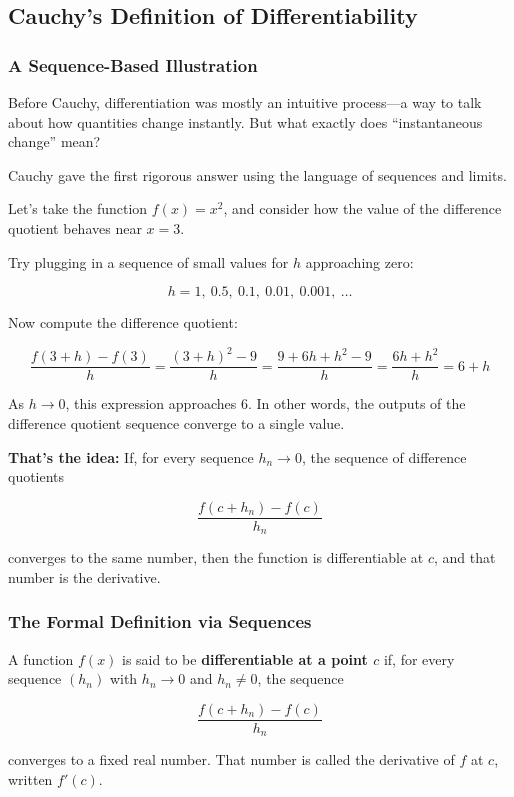 \subsection{Cauchy’s Definition of Differentiability}

\subsubsection{A Sequence-Based Illustration}

Before Cauchy, differentiation was mostly an intuitive process—a way to talk about how quantities change instantly. But what exactly does “instantaneous change” mean?

Cauchy gave the first rigorous answer using the language of sequences and limits.


Let’s take the function \( f(x) = x^2 \), and consider how the value of the difference quotient behaves near \( x = 3 \).

Try plugging in a sequence of small values for \( h \) approaching zero:

\[
h = 1,\ 0.5,\ 0.1,\ 0.01,\ 0.001,\ \dots
\]

Now compute the difference quotient:

\[
\frac{f(3 + h) - f(3)}{h} = \frac{(3 + h)^2 - 9}{h}
= \frac{9 + 6h + h^2 - 9}{h} = \frac{6h + h^2}{h} = 6 + h
\]

As \( h \to 0 \), this expression approaches 6. In other words, the outputs of the difference quotient sequence converge to a single value.

\textbf{That’s the idea:} If, for every sequence \( h_n \to 0 \), the sequence of difference quotients

\[
\frac{f(c + h_n) - f(c)}{h_n}
\]

converges to the same number, then the function is differentiable at \( c \), and that number is the derivative.

\subsubsection{The Formal Definition via Sequences}

A function \( f(x) \) is said to be \textbf{differentiable at a point \( c \)} if, for every sequence \( (h_n) \) with \( h_n \to 0 \) and \( h_n \neq 0 \), the sequence

\[
\frac{f(c + h_n) - f(c)}{h_n}
\]

converges to a fixed real number. That number is called the derivative of \( f \) at \( c \), written \( f'(c) \).

